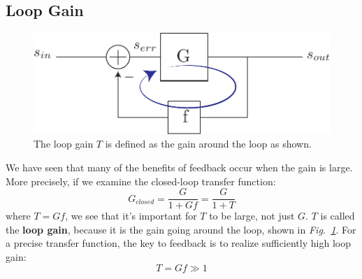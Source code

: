 \subsection{Loop Gain}
\begin{figure}[tb]
\centering
\includegraphics[scale=.7]{fbblock_loopgain}
\caption{The loop gain $T$ is defined as the gain around the loop as shown.}
\label{fig:fbblock_loopgain}
\end{figure}
We have seen that many of the benefits of feedback occur when the gain is large.  More precisely, if we examine the closed-loop transfer function:
    \begin{equation}
        {G_{closed}} = \frac{G}{{1 + Gf}} = \frac{G}{{1 + T}}
    \end{equation}
where $T = Gf$, we see that it's important for $T$ to be large, not just $G$.  $T$ is called the \textbf{loop gain}, because it is the gain going around the loop, shown in \emph{Fig.~\ref{fig:fbblock_loopgain}}.  For a precise transfer function, the key to feedback is to realize sufficiently high loop gain:
    \begin{equation}
        T = Gf \gg 1
    \end{equation}
\newpage
